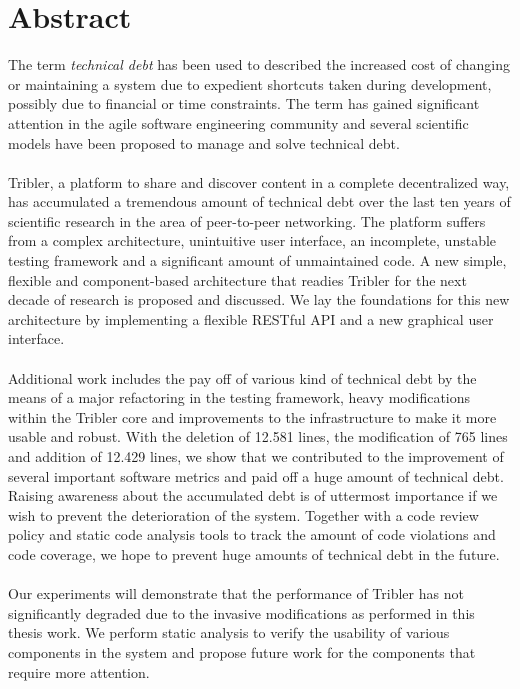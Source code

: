 \chapter*{Abstract}
The term \emph{technical debt} has been used to described the increased cost of changing or maintaining a system due to expedient shortcuts taken during development, possibly due to financial or time constraints. The term has gained significant attention in the agile software engineering community and several scientific models have been proposed to manage and solve technical debt.\\\\
Tribler, a platform to share and discover content in a complete decentralized way, has accumulated a tremendous amount of technical debt over the last ten years of scientific research in the area of peer-to-peer networking.
The platform suffers from a complex architecture, unintuitive user interface, an incomplete, unstable testing framework and a significant amount of unmaintained code.
A new simple, flexible and component-based architecture that readies Tribler for the next decade of research is proposed and discussed.
We lay the foundations for this new architecture by implementing a flexible RESTful API and a new graphical user interface.\\\\
Additional work includes the pay off of various kind of technical debt by the means of a major refactoring in the testing framework, heavy modifications within the Tribler core and improvements to the infrastructure to make it more usable and robust.
With the deletion of 12.581 lines, the modification of 765 lines and addition of 12.429 lines, we show that we contributed to the improvement of several important software metrics and paid off a huge amount of technical debt. Raising awareness about the accumulated debt is of uttermost importance if we wish to prevent the deterioration of the system.
Together with a code review policy and static code analysis tools to track the amount of code violations and code coverage, we hope to prevent huge amounts of technical debt in the future.\\\\
Our experiments will demonstrate that the performance of Tribler has not significantly degraded due to the invasive modifications as performed in this thesis work. We perform static analysis to verify the usability of various components in the system and propose future work for the components that require more attention.
